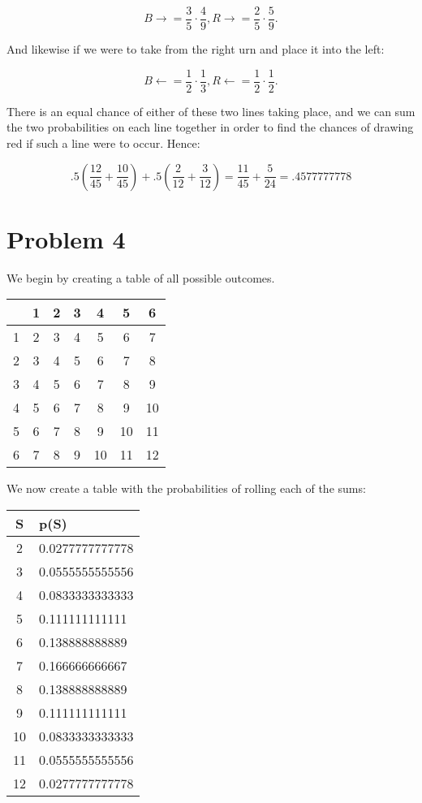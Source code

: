 \documentclass[12pt,a5paper]{article}
\begin{document}
\[
B \rightarrow = \frac{3}{5} \cdot \frac{4}{9}, R \rightarrow = \frac{2}{5} \cdot \frac{5}{9}.
\]

And likewise if we were to take from the right urn and place it into the left:

\[
B \leftarrow = \frac{1}{2} \cdot \frac{1}{3}, R \leftarrow = \frac{1}{2} \cdot \frac{1}{2}.
\]

There is an equal chance of either of these two lines taking place, and we can sum the two probabilities on each line together in order to find the chances of drawing red if such a line were to occur. Hence:

\[
.5 \left( \frac{12}{45} + \frac{10}{45} \right) + .5 \left( \frac{2}{12} + \frac{3}{12} \right) = \frac{11}{45} + \frac{5}{24} = .4577777778
\]


\section*{Problem 4}
We begin by creating a table of all possible outcomes.
\begin{tabular}{ c || c | c | c | c | c | c }
& 1 & 2 & 3 & 4 & 5 & 6 \\
\hline
\hline
1 & 2 & 3 & 4 & 5 & 6 & 7 \\
\hline
2 & 3 & 4 & 5 & 6 & 7 & 8 \\
\hline
3 & 4 & 5 & 6 & 7 & 8 & 9 \\
\hline
4 & 5 & 6 & 7 & 8 & 9 & 10 \\
\hline
5 & 6 & 7 & 8 & 9 & 10 & 11 \\
\hline
6 & 7 & 8 & 9 & 10 & 11 & 12 \\
\end{tabular}

We now create a table with the probabilities of rolling each of the sums:

\begin{tabular}{|c | l|}

\hline
S & p(S) \\
\hline
2 & 0.0277777777778 \\
\hline
3 & 0.0555555555556 \\
\hline
4 & 0.0833333333333 \\
\hline
5 & 0.111111111111 \\
\hline
6 & 0.138888888889 \\
\hline
7 & 0.166666666667 \\
\hline
8 & 0.138888888889 \\
\hline
9 & 0.111111111111 \\
\hline
10 & 0.0833333333333 \\
\hline
11 & 0.0555555555556 \\
\hline
12 & 0.0277777777778 \\
\hline
\end{tabular}
\end{document}
